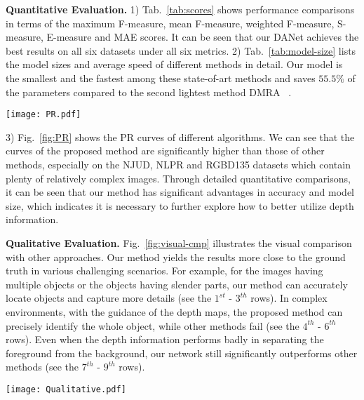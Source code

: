 \documentclass[runningheads]{llncs}
\begin{document}
\textbf{Quantitative Evaluation.}
 1) Tab.~\ref{tab:scores} shows performance comparisons in terms of the maximum F-measure, mean F-measure, weighted F-measure, S-measure, E-measure and MAE scores. 
It can be seen that our DANet achieves the best results on all six datasets  under all six metrics. 
2) Tab.~\ref{tab:model-size} lists the model sizes and average speed of different methods in detail. Our model is the smallest and the fastest among these state-of-art methods and saves $55.5\%$ of the parameters compared to the second lightest method DMRA~\cite{DMRA} .
\begin{figure*}
  \centering
  \texttt{[image: PR.pdf]}
  \caption{Precision (vertical axis) recall (horizontal axis) curves on six RGB-D salient object detection datasets.}
  \label{fig:PR}
  \end{figure*} 
3) Fig.~\ref{fig:PR} shows the PR curves of different algorithms. We can see that the curves of the proposed method are significantly higher than those of other methods, especially on the NJUD, NLPR and RGBD135 datasets which contain plenty of relatively complex images.  
Through detailed quantitative comparisons, it can be seen that our method has significant advantages in accuracy and model size, which indicates it is necessary to further explore how to better utilize depth information. 


 \textbf{Qualitative Evaluation.}
 Fig.~\ref{fig:visual-cmp} illustrates the visual comparison with other approaches. Our method yields the results more close to the ground truth in various challenging scenarios. For example, for the images having multiple objects or the objects having slender parts, our method can accurately locate objects and capture more details (see the $1^{st}$ - $3^{th}$ rows). In complex environments, with the guidance of the depth maps, the proposed method can precisely identify the whole object, while other methods fail (see the $4^{th}$ - $6^{th}$ rows). Even when the depth information performs badly in separating the foreground from the background, our network still significantly outperforms other methods (see the $7^{th}$ - $9^{th}$ rows). 

  
\begin{figure*}[ht]
  \centering
  \texttt{[image: Qualitative.pdf]}
  \caption{Visual comparison between our results and the state-of-the-art methods.}
  \label{fig:visual-cmp}
\end{figure*}
\end{document}
